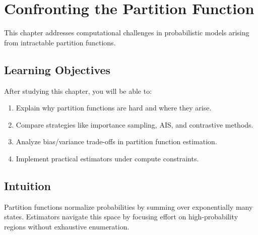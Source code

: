 
\chapter{Confronting the Partition Function}
\label{chap:partition-function}

This chapter addresses computational challenges in probabilistic models arising from intractable partition functions.


\section*{Learning Objectives}

After studying this chapter, you will be able to:

\begin{enumerate}
    \item Explain why partition functions are hard and where they arise.
    \item Compare strategies like importance sampling, AIS, and contrastive methods.
    \item Analyze bias/variance trade-offs in partition function estimation.
    \item Implement practical estimators under compute constraints.
\end{enumerate}



\section*{Intuition}

Partition functions normalize probabilities by summing over exponentially many states. Estimators navigate this space by focusing effort on high-probability regions without exhaustive enumeration.











